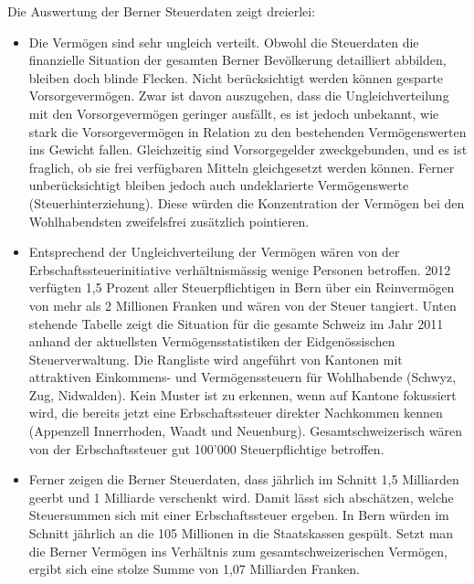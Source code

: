 \documentclass[a4paper, 12pt,liststotoc]{scrartcl}
\numberwithin{equation}{section}
\begin{document}
Die Auswertung der Berner Steuerdaten zeigt dreierlei:

\begin{itemize}
\item
  Die Vermögen sind sehr ungleich verteilt. Obwohl die Steuerdaten die
  finanzielle Situation der gesamten Berner Bevölkerung detailliert
  abbilden, bleiben doch blinde Flecken. Nicht berücksichtigt werden
  können gesparte Vorsorgevermögen. Zwar ist davon auszugehen, dass die
  Ungleichverteilung mit den Vorsorgevermögen geringer ausfällt, es ist
  jedoch unbekannt, wie stark die Vorsorgevermögen in Relation zu den
  bestehenden Vermögenswerten ins Gewicht fallen. Gleichzeitig sind
  Vorsorgegelder zweckgebunden, und es ist fraglich, ob sie frei
  verfügbaren Mitteln gleichgesetzt werden können. Ferner
  unberücksichtigt bleiben jedoch auch undeklarierte Vermögenswerte
  (Steuerhinterziehung). Diese würden die Konzentration der Vermögen bei
  den Wohlhabendsten zweifelsfrei zusätzlich pointieren.
\item
  Entsprechend der Ungleichverteilung der Vermögen wären von der
  Erbschaftssteuerinitiative verhältnismässig wenige Personen betroffen.
  2012 verfügten 1,5 Prozent aller Steuerpflichtigen in Bern über ein
  Reinvermögen von mehr als 2 Millionen Franken und wären von der Steuer
  tangiert. Unten stehende Tabelle zeigt die Situation für die gesamte
  Schweiz im Jahr 2011 anhand der aktuellsten Vermögensstatistiken der
  Eidgenössischen Steuerverwaltung. Die Rangliste wird angeführt von
  Kantonen mit attraktiven Einkommens- und Vermögenssteuern für
  Wohlhabende (Schwyz, Zug, Nidwalden). Kein Muster ist zu erkennen,
  wenn auf Kantone fokussiert wird, die bereits jetzt eine
  Erbschaftssteuer direkter Nachkommen kennen (Appenzell Innerrhoden,
  Waadt und Neuenburg). Gesamtschweizerisch wären von der
  Erbschaftssteuer gut 100'000 Steuerpflichtige betroffen.
\item
  Ferner zeigen die Berner Steuerdaten, dass jährlich im Schnitt 1,5
  Milliarden geerbt und 1 Milliarde verschenkt wird. Damit lässt sich
  abschätzen, welche Steuersummen sich mit einer Erbschaftssteuer
  ergeben. In Bern würden im Schnitt jährlich an die 105 Millionen in
  die Staatskassen gespült. Setzt man die Berner Vermögen ins Verhältnis
  zum gesamtschweizerischen Vermögen, ergibt sich eine stolze Summe von
  1,07 Milliarden Franken.
\end{itemize}
\end{document}
